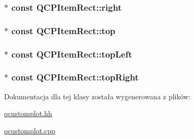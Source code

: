 \subsubsection[{\texorpdfstring{right}{right}}]{$\ast$ const Q\+C\+P\+Item\+Rect\+::right}\hypertarget{class_q_c_p_item_rect_a7979c1915f61ad2609a9cc179c2e445e}{}\label{class_q_c_p_item_rect_a7979c1915f61ad2609a9cc179c2e445e}
\subsubsection[{\texorpdfstring{top}{top}}]{$\ast$ const Q\+C\+P\+Item\+Rect\+::top}\hypertarget{class_q_c_p_item_rect_a96e50db552fb297d6fb62614676217bc}{}\label{class_q_c_p_item_rect_a96e50db552fb297d6fb62614676217bc}
\subsubsection[{\texorpdfstring{top\+Left}{topLeft}}]{$\ast$ const Q\+C\+P\+Item\+Rect\+::top\+Left}\hypertarget{class_q_c_p_item_rect_aa70feeef173489b03c3fbe906a5023c4}{}\label{class_q_c_p_item_rect_aa70feeef173489b03c3fbe906a5023c4}
\subsubsection[{\texorpdfstring{top\+Right}{topRight}}]{$\ast$ const Q\+C\+P\+Item\+Rect\+::top\+Right}\hypertarget{class_q_c_p_item_rect_a77e0eb6e4aa6efee620d35e2c21bdad7}{}\label{class_q_c_p_item_rect_a77e0eb6e4aa6efee620d35e2c21bdad7}


Dokumentacja dla tej klasy została wygenerowana z plików\+:\begin{DoxyCompactItemize}
\item 
\hyperlink{qcustomplot_8hh}{qcustomplot.\+hh}\item 
\hyperlink{qcustomplot_8cpp}{qcustomplot.\+cpp}\end{DoxyCompactItemize}
